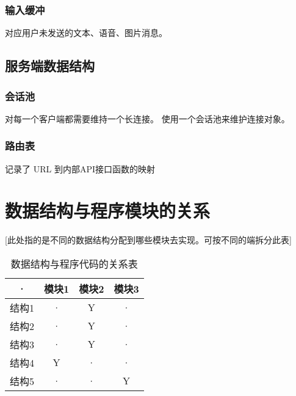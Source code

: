 \subsubsection{输入缓冲}
对应用户未发送的文本、语音、图片消息。

\subsection{服务端数据结构}

\subsubsection{会话池}
对每一个客户端都需要维持一个长连接。
使用一个会话池来维护连接对象。

\subsubsection{路由表}
记录了 URL 到内部API接口函数的映射



\section{数据结构与程序模块的关系}
[此处指的是不同的数据结构分配到哪些模块去实现。可按不同的端拆分此表]
\begin{table}[htbp]
\centering
\caption{数据结构与程序代码的关系表} \label{tab:datastructure-module}
\begin{tabular}{|c|c|c|c|}
    \hline
    · & 模块1 & 模块2 & 模块3 \\
    \hline
    结构1 & · & Y & · \\
    \hline
    结构2 & · & Y & · \\
    \hline
    结构3 & · & Y & · \\
    \hline
    结构4 & Y & · & · \\
    \hline
    结构5 & · & · & Y \\
    \hline
\end{tabular}
\end{table}